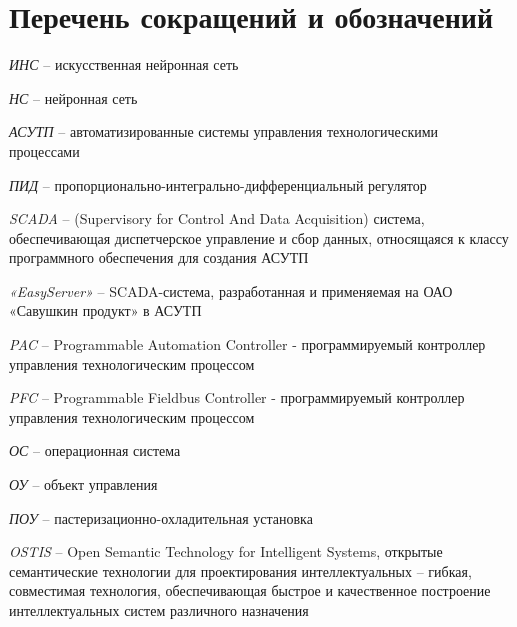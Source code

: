 \chapter*{Перечень сокращений и обозначений}

\textit{ИНС} -- искусственная нейронная сеть

\textit{НС} -- нейронная сеть

\textit{АСУТП} -- автоматизированные системы управления технологическими процессами

\textit{ПИД} -- пропорционально-интегрально-дифференциальный регулятор

\textit{SCADA} -- (Supervisory for Control And Data Acquisition) система, обеспечивающая диспетчерское управление и сбор данных, относящаяся к классу программного обеспечения для создания АСУТП

\textit{«EasyServer»} -- SCADA-система, разработанная и применяемая на ОАО «Савушкин продукт» в АСУТП

\textit{PAC} -- Programmable Automation Controller - программируемый контроллер управления технологическим процессом

\textit{PFC} -- Programmable Fieldbus Controller - программируемый контроллер управления технологическим процессом

\textit{ОС} -- операционная система

\textit{ОУ} -- объект управления

\textit{ПОУ} -- пастеризационно-охладительная установка

\textit{OSTIS} -- Open Semantic Technology for Intelligent Systems, открытые семантические технологии для проектирования интеллектуальных -- гибкая, совместимая технология, обеспечивающая быстрое и качественное построение интеллектуальных систем различного назначения
